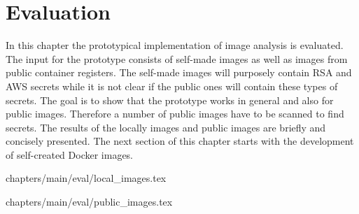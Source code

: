 \chapter{Evaluation}
\label{ch:eval}
In this chapter the prototypical implementation of image analysis is evaluated. 
The input for the prototype consists of self-made images as well as images from public container registers. 
The self-made images will purposely contain RSA and AWS secrets while it is not clear if the public ones will contain these types of secrets. 
The goal is to show that the prototype works in general and also for public images.
Therefore a number of public images have to be scanned to find secrets.
The results of the locally images and public images are briefly and concisely presented.
The next section of this chapter starts with the development of self-created Docker images.

 {chapters/main/eval/local_images.tex}

 {chapters/main/eval/public_images.tex}